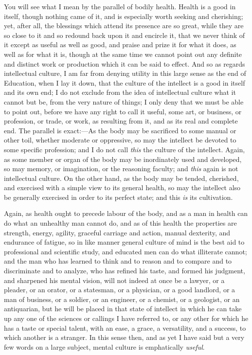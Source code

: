 You will see what I mean by the parallel of bodily health. Health
is a good in itself, though nothing came of it, and is especially
worth seeking and cherishing; yet, after all, the blessings which
attend its presence are so great, while they are so close to it and so
redound back upon it and encircle it, that we never think of it
except as useful as well as good, and praise and prize it for what it
does, as well as for what it is, though at the same time we cannot
point out any definite and distinct work or production which it can be
said to effect. And so as regards intellectual culture, I am far from
denying utility in this large sense as the end of Education, when I
lay it down, that the culture of the intellect is a good in itself and
its own end; I do not exclude from the idea of intellectual culture
what it cannot but be, from the very nature of things; I only deny
that we must be able to point out, before we have any right to call it
useful, some art, or business, or profession, or trade, or work, as
resulting from it, and as its real and complete end. The parallel is
exact:—As the body may be sacrificed to some manual or other toil,
whether moderate or oppressive, so may the intellect be devoted to
some specific profession; and I do not call \emph{this} the culture of
the intellect. Again, as some member or organ of the body may be
inordinately used and developed, so may memory, or imagination, or the
reasoning faculty; and \emph{this} again is not intellectual culture.
On the other hand, as the body may be tended, cherished, and exercised
with a simple view to its general health, so may the intellect also be
generally exercised in order to its perfect state; and this \emph{is}
its cultivation.

Again, as health ought to precede labour of the body, and as a man
in health can do what an unhealthy man cannot do, and as of this
health the properties are strength, energy, agility, graceful carriage
and action, manual dexterity, and endurance of fatigue, so in like
manner general culture of mind is the best aid to professional and
scientific study, and educated men can do what illiterate cannot; and
the man who has learned to think and to reason and to compare
and to discriminate and to analyze, who has refined his taste, and
formed his judgment, and sharpened his mental vision, will not indeed
at once be a lawyer, or a pleader, or an orator, or a statesman, or a
physician, or a good landlord, or a man of business, or a soldier, or
an engineer, or a chemist, or a geologist, or an antiquarian, but he
will be placed in that state of intellect in which he can take up any
one of the sciences or callings I have referred to, or any other for
which he has a taste or special talent, with an ease, a grace, a
versatility, and a success, to which another is a stranger. In this
sense then, and as yet I have said but a very few words on a large
subject, mental culture is emphatically \emph{useful}.

